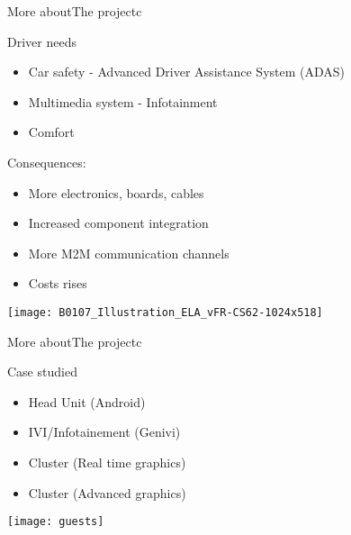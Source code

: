 \documentclass[english,slidetop,9pt,aspectratio=169]{beamer}
\begin{document}
  \begin{myframe}{More about}{The project}{c}
    \begin{minipage}{0.4\textwidth}
      \begin{nbox}{Driver needs}
        \begin{itemize}[<+->]
        \item Car safety - Advanced Driver Assistance System (ADAS)
        \item Multimedia system - Infotainment
        \item Comfort
        \end{itemize}
      \end{nbox}
      \begin{nbox}{Consequences:}
        \begin{itemize}
        \item More electronics, boards, cables
        \item Increased component integration
        \item More M2M communication channels
        \item Costs rises
        \end{itemize}
      \end{nbox}
    \end{minipage}
    \begin{minipage}{0.59\textwidth}
      \begin{center}
        \texttt{[image: B0107\_Illustration\_ELA\_vFR-CS62-1024x518]}
      \end{center}
    \end{minipage}
  \end{myframe}

  \begin{myframe}{More about}{The project}{c}
    \begin{minipage}{0.4\textwidth}
      \begin{nbox}{Case studied}
        \begin{itemize}
        \item Head Unit (Android)
        \item IVI/Infotainement (Genivi)
        \item Cluster (Real time graphics)
        \item Cluster (Advanced graphics)
        \end{itemize}
      \end{nbox}
    \end{minipage}
    \begin{minipage}{0.59\textwidth}
      \centering
      \texttt{[image: guests]}
    \end{minipage}
  \end{myframe}
\end{document}
